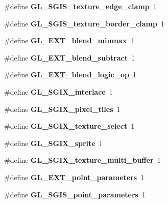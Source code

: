 \begin{DoxyCompactItemize}
\item 
\#define {\bfseries G\+L\+\_\+\+S\+G\+I\+S\+\_\+texture\+\_\+edge\+\_\+clamp}~1\label{_s_d_l__opengl_8h_ac85770ab31ac7dd3e2ebbe148d95e4ed}

\item 
\#define {\bfseries G\+L\+\_\+\+S\+G\+I\+S\+\_\+texture\+\_\+border\+\_\+clamp}~1\label{_s_d_l__opengl_8h_a997be60e68a4b84179b5db2c88d308d8}

\item 
\#define {\bfseries G\+L\+\_\+\+E\+X\+T\+\_\+blend\+\_\+minmax}~1\label{_s_d_l__opengl_8h_aca9a340fdf5ab9a27d6fb47a0909ce04}

\item 
\#define {\bfseries G\+L\+\_\+\+E\+X\+T\+\_\+blend\+\_\+subtract}~1\label{_s_d_l__opengl_8h_a0490f7eeafebf2764e2f619714d01fec}

\item 
\#define {\bfseries G\+L\+\_\+\+E\+X\+T\+\_\+blend\+\_\+logic\+\_\+op}~1\label{_s_d_l__opengl_8h_aa1aa3faa1e82e39106a172b131f15575}

\item 
\#define {\bfseries G\+L\+\_\+\+S\+G\+I\+X\+\_\+interlace}~1\label{_s_d_l__opengl_8h_a63e0af1acbd328bc8d66489d92da1991}

\item 
\#define {\bfseries G\+L\+\_\+\+S\+G\+I\+X\+\_\+pixel\+\_\+tiles}~1\label{_s_d_l__opengl_8h_a76393e896fa88bfac496ee335f00cfc0}

\item 
\#define {\bfseries G\+L\+\_\+\+S\+G\+I\+X\+\_\+texture\+\_\+select}~1\label{_s_d_l__opengl_8h_a33a5a60ad4b86f03452cdfde272fbacc}

\item 
\#define {\bfseries G\+L\+\_\+\+S\+G\+I\+X\+\_\+sprite}~1\label{_s_d_l__opengl_8h_a339eae36935891c84bf38b6c37ec5c8a}

\item 
\#define {\bfseries G\+L\+\_\+\+S\+G\+I\+X\+\_\+texture\+\_\+multi\+\_\+buffer}~1\label{_s_d_l__opengl_8h_a1a802672ec617abcc925a8f791f58f16}

\item 
\#define {\bfseries G\+L\+\_\+\+E\+X\+T\+\_\+point\+\_\+parameters}~1\label{_s_d_l__opengl_8h_abf4fa8180bd121eac57d9d7134ccd0d9}

\item 
\#define {\bfseries G\+L\+\_\+\+S\+G\+I\+S\+\_\+point\+\_\+parameters}~1\label{_s_d_l__opengl_8h_ab69782929d6726c76311d6b2eb5a272d}


\end{DoxyCompactItemize}
